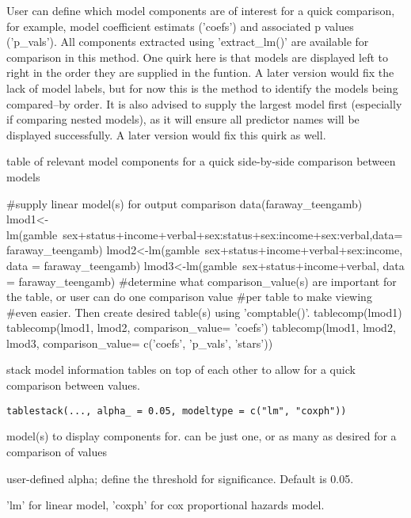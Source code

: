 \documentclass[a4paper]{book}
\begin{document}
\begin{Details}
User can define which model components are of interest for a quick comparison, for example, model coefficient estimats ('coefs') and associated p values ('p\_vals'). All components extracted
using 'extract\_lm()' are available for comparison in this method. One quirk here is that models are displayed left to right in the order they are supplied in the funtion. A later version would fix the
lack of model labels, but for now this is the method to identify the models being compared--by order. It is also advised to supply the largest model first (especially if comparing nested models), as it will
ensure all predictor names will be displayed successfully. A later version would fix this quirk as well.
\end{Details}
%
\begin{Value}
table of relevant model components for a quick side-by-side comparison between models
\end{Value}
%
\begin{Examples}
\begin{ExampleCode}
#supply linear model(s) for output comparison
 data(faraway_teengamb)
 lmod1<-lm(gamble~sex+status+income+verbal+sex:status+sex:income+sex:verbal,data=faraway_teengamb)
 lmod2<-lm(gamble~sex+status+income+verbal+sex:income, data = faraway_teengamb)
 lmod3<-lm(gamble~sex+status+income+verbal, data = faraway_teengamb)
#determine what comparison_value(s) are important for the table, or user can do one comparison value
#per table to make viewing #even easier. Then create desired table(s) using 'comptable()'.
tablecomp(lmod1)
tablecomp(lmod1, lmod2, comparison_value= 'coefs')
tablecomp(lmod1, lmod2, lmod3, comparison_value= c('coefs', 'p_vals', 'stars'))

\end{ExampleCode}
\end{Examples}
%
\begin{Description}
stack model information tables on top of each other to allow for a quick comparison between values.
\end{Description}
%
\begin{Usage}
\begin{verbatim}
tablestack(..., alpha_ = 0.05, modeltype = c("lm", "coxph"))
\end{verbatim}
\end{Usage}
%
\begin{Arguments}
\begin{ldescription}
\item[\code{...}] model(s) to display components for. can be just one, or as many as desired for a comparison of values

\item[\code{alpha\_}] user-defined alpha; define the threshold for significance. Default is 0.05.

\item[\code{modeltype}] 'lm' for linear model, 'coxph' for cox proportional hazards model.
\end{ldescription}
\end{Arguments}
\end{document}
